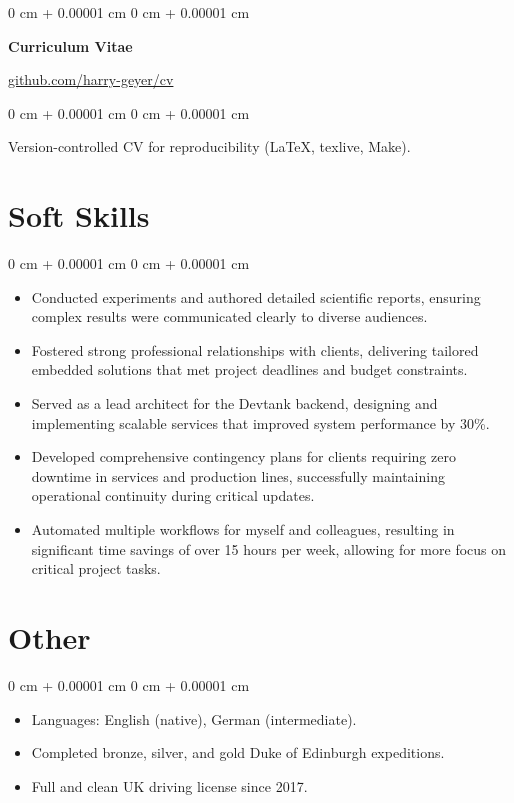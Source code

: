 \documentclass[10pt, letterpaper]{article}
\newenvironment{highlights}{
    \begin{itemize}[
        topsep=0.15 cm,
        parsep=0.15 cm,
        partopsep=0pt,
        itemsep=0pt,
        leftmargin=0 cm + 10pt
    ]
}{
    \end{itemize}
}
\newenvironment{onecolentry}{
    \begin{adjustwidth}{
        0 cm + 0.00001 cm
    }{
        0 cm + 0.00001 cm
    }
}{
    \end{adjustwidth}
}
\newenvironment{twocolentry}[2][]{
    \onecolentry
    \def\secondColumn{#2}
    \setcolumnwidth{\fill, 4.5 cm}
    \begin{paracol}{2}
}{
    \switchcolumn \raggedleft \secondColumn
    \end{paracol}
    \endonecolentry
}
\begin{document}
        \begin{twocolentry}{\href{https://github.com/harry-geyer/cv}{github.com/harry-geyer/cv}}
            \textbf{Curriculum Vitae}
        \end{twocolentry}

        \vspace{0.10 cm}
        \begin{onecolentry}
            Version-controlled CV for reproducibility (LaTeX, texlive, Make).
        \end{onecolentry}

    \section{Soft Skills}

        \begin{onecolentry}
            \begin{highlights}
                \item Conducted experiments and authored detailed scientific reports, ensuring complex results were communicated clearly to diverse audiences.
                \item Fostered strong professional relationships with clients, delivering tailored embedded solutions that met project deadlines and budget constraints.
                \item Served as a lead architect for the Devtank backend, designing and implementing scalable services that improved system performance by 30\%.
                \item Developed comprehensive contingency plans for clients requiring zero downtime in services and production lines, successfully maintaining operational continuity during critical updates.
                \item Automated multiple workflows for myself and colleagues, resulting in significant time savings of over 15 hours per week, allowing for more focus on critical project tasks.
            \end{highlights}
        \end{onecolentry}

    \section{Other}

        \begin{onecolentry}
            \begin{highlights}
                \item Languages: English (native), German (intermediate).
                \item Completed bronze, silver, and gold Duke of Edinburgh expeditions.
                \item Full and clean UK driving license since 2017.
            \end{highlights}
        \end{onecolentry}
\end{document}

